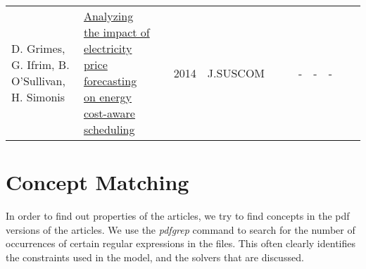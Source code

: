 \documentclass[a4paper]{article}
\begin{document}
{\begin{longtable}{p{3cm}p{6cm}rrcrlcccp{1.5cm}l}
D. Grimes, G. Ifrim, B. O'Sullivan, H. Simonis & \href{papers/GrimesIOS14.pdf}{Analyzing the impact of electricity price forecasting on energy cost-aware scheduling} & \cite{GrimesIOS14} & 2014 & J.SUSCOM& & & - & - & - & & \\
\end{longtable}
}


\section{Concept Matching}

In order to find out properties of the articles, we try to find concepts in the pdf versions of the articles. We use the \emph{pdfgrep} command to search for the number of occurrences of certain regular expressions in the files. This often clearly identifies the constraints used in the model, and the solvers that are discussed.  
\end{document}

